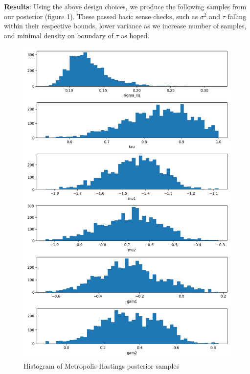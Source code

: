 \documentclass[12pt,letterpaper,twoside]{article}
\begin{document}
\textbf{Results}: Using the above design choices, we produce the following 
samples from our posterior (figure 1). These passed basic 
sense checks, such as $\sigma^2$ and $\tau$ falling within 
their respective bounds, lower variance as we increase number 
of samples, and minimal density on boundary of $\tau$ as hoped.
\begin{figure}[H]
    \centering
    \includegraphics[scale=0.7]{mh_sampled_histogram.png}
    \caption{Histogram of Metropolis-Hastings posterior samples}
\end{figure}
\end{document}
